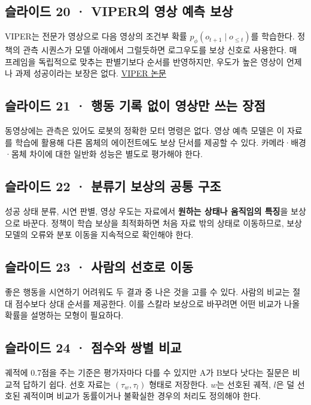 \documentclass[11pt,a4paper]{article}
\begin{document}
\subsection{슬라이드 20 · VIPER의 영상 예측 보상}

VIPER는 전문가 영상으로 다음 영상의 조건부 확률 $p_\phi(o_{t+1}\mid o_{\le t})$를 학습한다. 정책의 관측 시퀀스가 모델 아래에서 그럴듯하면 로그우도를 보상 신호로 사용한다. 매 프레임을 독립적으로 맞추는 판별기보다 순서를 반영하지만, 우도가 높은 영상이 언제나 과제 성공이라는 보장은 없다. \href{https://arxiv.org/abs/2305.14343}{VIPER 논문}\par

\subsection{슬라이드 21 · 행동 기록 없이 영상만 쓰는 장점}

동영상에는 관측은 있어도 로봇의 정확한 모터 명령은 없다. 영상 예측 모델은 이 자료를 학습에 활용해 다른 몸체의 에이전트에도 보상 단서를 제공할 수 있다. 카메라·배경·몸체 차이에 대한 일반화 성능은 별도로 평가해야 한다.\par

\subsection{슬라이드 22 · 분류기 보상의 공통 구조}

성공 상태 분류, 시연 판별, 영상 우도는 자료에서 \textbf{원하는 상태나 움직임의 특징}을 보상으로 바꾼다. 정책이 학습 보상을 최적화하면 처음 자료 밖의 상태로 이동하므로, 보상모델의 오류와 분포 이동을 지속적으로 확인해야 한다.\par

\subsection{슬라이드 23 · 사람의 선호로 이동}

좋은 행동을 시연하기 어려워도 두 결과 중 나은 것을 고를 수 있다. 사람의 비교는 절대 점수보다 상대 순서를 제공한다. 이를 스칼라 보상으로 바꾸려면 어떤 비교가 나올 확률을 설명하는 모형이 필요하다.\par

\subsection{슬라이드 24 · 점수와 쌍별 비교}

궤적에 0.7점을 주는 기준은 평가자마다 다를 수 있지만 A가 B보다 낫다는 질문은 비교적 답하기 쉽다. 선호 자료는 $(\tau_w,\tau_l)$ 형태로 저장한다. $w$는 선호된 궤적, $l$은 덜 선호된 궤적이며 비교가 동률이거나 불확실한 경우의 처리도 정의해야 한다.\par
\end{document}
